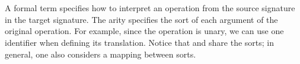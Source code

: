 \begin{code}
\>[0][@{}l@{\AgdaIndent{0}}]%
\>[1]\AgdaSpace{}%
%
\>[11]\AgdaSymbol{(}\AgdaSpace{}%
\AgdaSymbol{:}\AgdaSpace{}%
\AgdaSpace{}%
\AgdaSymbol{)}\AgdaSpace{}%
\AgdaSymbol{:}\AgdaSpace{}%
\AgdaSymbol{(}\AgdaSpace{}%
\AgdaSymbol{)}\AgdaSpace{}%
\AgdaSpace{}%
\AgdaSpace{}%
\<%
\\
\>[1][@{}l@{\AgdaIndent{0}}]%
\>[3]\AgdaInductiveConstructor{\#}%
\>[7]\AgdaSymbol{:}\AgdaSpace{}%
\AgdaSymbol{(}\AgdaSpace{}%
\AgdaSymbol{:}\AgdaSpace{}%
\AgdaSpace{}%
\AgdaSymbol{(}\AgdaSpace{}%
\AgdaSymbol{))}\AgdaSpace{}%
\AgdaSpace{}%
\AgdaSpace{}%
\AgdaSpace{}%
\AgdaSymbol{(}\AgdaSpace{}%
\AgdaSpace{}%
\AgdaSymbol{)}\<%
\\
%
\>[3]\AgdaSpace{}%
\AgdaSymbol{:}\AgdaSpace{}%
%
\>[113I]\AgdaSymbol{\{}\AgdaSpace{}%
\AgdaSymbol{\}}\AgdaSpace{}%
\AgdaSpace{}%
\AgdaSpace{}%
\AgdaSpace{}%
\AgdaSymbol{(}\AgdaSpace{}%
\AgdaOperator{\AgdaInductiveConstructor{,}}\AgdaSpace{}%
\AgdaSymbol{)}\AgdaSpace{}%
\AgdaSpace{}\AgdaSpace{}%
\AgdaSymbol{(}\AgdaSpace{}%
\AgdaSymbol{)}\AgdaSpace{}%
\AgdaSpace{}%
\AgdaSpace{}%
\AgdaSpace{}%
\AgdaSpace{}%
\<%
\end{code}

A formal term specifies how to interpret an operation from the source
signature in the target signature. The arity  specifies the sort
of each argument of the original operation. For example, since the
operation  is unary, we can use one identifier
when defining its translation. Notice that  and
 share the sorts; in general, one also considers a
mapping between sorts.

